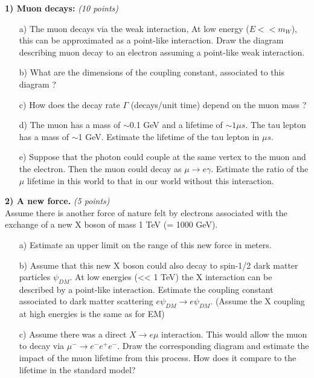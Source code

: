{\large

\textbf{1) Muon decays: } \hfill \textit{(10 points)}\\
\begin{itemize}
  \item[a)]{ The muon decays via the weak interaction,  At low energy ($E << m_W$), this can be approximated as a point-like interaction. 
  Draw the diagram describing muon decay to an electron assuming a point-like weak interaction.
}
  \item[b)]{ What are the dimensions of the coupling constant, associated to this diagram  ?
  }
  \item[c)] How does the decay rate $\Gamma$ (decays/unit time)  depend on the muon mass ? 
  \item[d)]{ The muon has a mass of $\sim$0.1 GeV and a lifetime of $\sim 1 \mu s$. The tau lepton has a mass of {$\sim$1 GeV}. Estimate the lifetime of the tau lepton in $\mu s$.
}
  \item[e)] {Suppose that the photon could couple at the same vertex to the muon and the electron. Then the muon could decay as $\mu\rightarrow e \gamma$. 
  Estimate the ratio of the $\mu$ lifetime in this world to that in our world without this interaction.
  }
\end{itemize}



\vspace*{0.25in}

\textbf{2) A new force. } \hfill \textit{(5 points)}\\
Assume there is another force of nature felt by electrons associated with the exchange of a new X boson of mass 1 TeV (= 1000 GeV).
\begin{itemize}
\item[a)]{ Estimate an upper limit on the range of this new force in meters.
}
\item[b)]{ Assume that this new X boson could also decay to spin-1/2 dark matter particles $\psi_{DM}$. At low energies (<< 1 TeV) the X interaction can be described by a point-like interaction. Estimate the coupling constant associated to dark matter scattering $e \psi_{DM} \rightarrow e \psi_{DM}$.   (Assume the X coupling at high energies is the same as for EM)  }
\item[c)]{ Assume there was a direct $X\rightarrow e\mu$ interaction. This would allow the muon to decay via $\mu^- \rightarrow e^-e^+e^-$. Draw the corresponding diagram and estimate the impact of the muon lifetime from this process.  How does it compare to the lifetime in the standard model?     }
\end{itemize}

}
